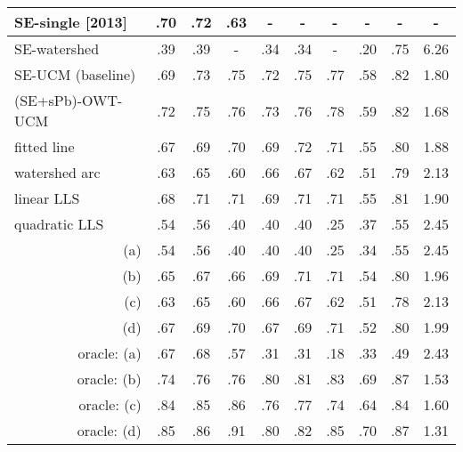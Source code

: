 \begin{table}[htbp]
\begin{tabular}{l|c|c|c||c|c|c||c|c|c|}
\hline
\hline
\multicolumn{1}{|l|}{\cite{DollarICCV13edges} SE-single [2013]} & .70 & .72 & .63 & - & - & - & - & - & - \\
\hline
\hline
\multicolumn{1}{|l|}{SE-watershed} & .39 & .39 & - & .34 & .34 & - & .20 & .75 & 6.26 \\
\hline
\multicolumn{1}{|l|}{SE-UCM (baseline)} & .69 &.73 & .75 & .72 & .75 & .77 & .58 & .82 & 1.80 \\
\hline
\multicolumn{1}{|l|}{(SE+sPb)-OWT-UCM} & .72 & .75 & .76 & .73 & .76 & .78 & .59 & .82 & 1.68 \\ %
\hline
\hline
\multicolumn{1}{|l|}{fitted line} &  .67 & .69 & .70 & .69 & .72 & .71 & .55 & .80 & 1.88 \\ %
\hline
\multicolumn{1}{|l|}{watershed arc} & .63 & .65 & .60 & .66 & .67 & .62 & .51 & .79 & 2.13 \\ %
\hline
\hline
\multicolumn{1}{|l|}{linear LLS} & .68 & .71 & .71 & .69 & .71 & .71 & .55 & .81 & 1.90 \\%
\hline
\multicolumn{1}{|l|}{quadratic LLS} & .54 & .56 & .40 & .40 & .40 & .25 & .37 & .55 & 2.45 \\
\hline
\hline
\hline 
\multicolumn{1}{|r|}{(a)} & .54 & .56 & .40 & .40 & .40 & .25 & .34 & .55 & 2.45 \\
\hline 
\multicolumn{1}{|r|}{(b)} & .65 & .67 & .66 & .69 & .71 & .71 & .54 & .80 & 1.96 \\
\hline 
\multicolumn{1}{|r|}{(c)} & .63 & .65 & .60 & .66 & .67 & .62 & .51 & .78 & 2.13 \\
\hline 
\multicolumn{1}{|r|}{(d)} & .67 & .69 & .70 & .67 & .69 & .71 & .52 & .80 & 1.99 \\
\hline
\hline 
\multicolumn{1}{|r|}{oracle: (a)} & .67 & .68 & .57 & .31 & .31 & .18 & .33 & .49 & 2.43 \\
\hline
\multicolumn{1}{|r|}{oracle: (b)} & .74 & .76 & .76 & .80 & .81 & .83 & .69 & .87 & 1.53 \\
\hline 
\multicolumn{1}{|r|}{oracle: (c)} & .84 & .85 & .86 & .76 & .77 & .74 & .64 & .84 & 1.60 \\
\hline 
\multicolumn{1}{|r|}{oracle: (d)} & .85 & .86 & .91 & .80 & .82 & .85 & .70 & .87 & 1.31 \\

\end{tabular}
\end{table}
